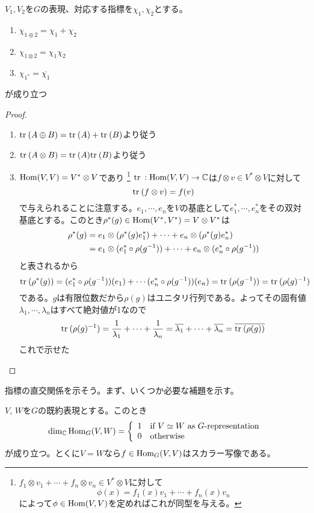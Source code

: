 \documentclass{ltjsreport}
\begin{document}
\begin{prop}\label{char_property}
  $V_1,V_2$を$G$の表現、対応する指標を$\chi_1,\chi_2$とする。
  \begin{enumerate}
    \item $\chi_{1\oplus 2}=\chi_1+\chi_2$
    \item $\chi_{1\otimes 2}=\chi_1\chi_2$
    \item $\chi_{1^*}=\overline{\chi_1}$
  \end{enumerate}
  が成り立つ
\end{prop}

\begin{proof}
  \begin{enumerate}
    \item $\text{tr}\:(A\oplus B)=\text{tr}\:(A)+\text{tr}\:(B)$より従う
    \item $\text{tr}\:(A\otimes B)=\text{tr}\:(A)\text{tr}\:(B)$より従う
    \item $\text{Hom}(V,V)= V^*\otimes V$であり
    \footnote{$f_1\otimes v_1+\cdots+f_n\otimes v_n\in V^*\otimes V$に対して
    \[
    \phi(x)=f_1(x)v_1+\cdots+f_n(x)v_n
    \]
    によって$\phi\in\text{Hom}(V,V)$を定めればこれが同型を与える。
    }
    $\text{tr}\::\text{Hom}(V,V)\rightarrow \mathbb{C}$は$f\otimes v\in V^*\otimes V$に対して
    \[
    \text{tr}\:(f\otimes v)=f(v)
    \]
    で与えられることに注意する。$e_1,\cdots,e_n$を$V$の基底として$e_1^*,\cdots,e_n^*$をその双対基底とする。このとき$\rho^*(g)\in\text{Hom}(V^*,V^*)=V\otimes V^*$は
    \begin{align*}
    \rho^*(g)
    &=e_1\otimes(\rho^*(g)e_1^*)+\cdots+e_n\otimes(\rho^*(g)e_n^*)  \\
    &=e_1\otimes(e_1^*\circ\rho(g^{-1}))+\cdots+e_n\otimes(e_n^*\circ\rho(g^{-1}))
    \end{align*}
    と表されるから
    \[
    \text{tr}\:(\rho^*(g))=(e_1^*\circ\rho(g^{-1}))(e_1)+\cdots (e_n^*\circ\rho(g^{-1}))(e_n)=\text{tr}\:(\rho(g^{-1}))=\text{tr}\:(\rho(g)^{-1})
    \]
    である。$g$は有限位数だから$\rho(g)$はユニタリ行列である。よってその固有値$\lambda_1,\cdots,\lambda_n$はすべて絶対値が1なので
    \[
    \text{tr}\:(\rho(g)^{-1})=\frac{1}{\lambda_1}+\cdots+\frac{1}{\lambda_n}=\overline{\lambda_1}+\cdots+\overline{\lambda_n}=\overline{\text{tr}\:(\rho(g))}
    \]
    これで示せた
  \end{enumerate}
\end{proof}




指標の直交関係を示そう。まず、いくつか必要な補題を示す。
\begin{lemm}[Schurの補題]\label{schur_lem}
  $V$, $W$を$G$の既約表現とする。このとき
  \[
  \dim_{\mathbb{C}}\text{Hom}_G(V,W)=\left\{\begin{array}{cl}
    1 & \text{if $V\simeq W$ as $G$-representation}\\
    0 & \text{otherwise}
  \end{array}\right.
  \]
  が成り立つ。とくに$V=W$なら$f\in\text{Hom}_G(V,V)$はスカラー写像である。
\end{lemm}
\end{document}
